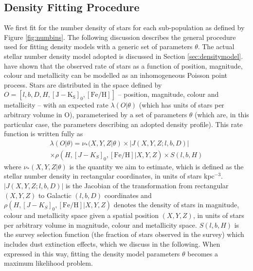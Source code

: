 \subsection{Density Fitting Procedure}
\label{sec:densfit}
We first fit for the number density of stars for each sub-population as defined by Figure \ref{fig:numbins}. The following discussion describes the general procedure used for fitting density models with a generic set of parameters $\theta$. The actual stellar number density model adopted is discussed in Section \ref{sec:densitymodel}. \citet{2016ApJ...823...30B,2012ApJ...753..148B,2013A&ARv..21...61R} have shown that the observed rate of stars as a function of position, magnitude, colour and metallicity can be modelled as an inhomogeneous Poisson point process. Stars are distributed in the space defined by $O = [l,b,D,H,\mathrm{[J-K_S]_0}, \mathrm{[Fe/H]}]$ -- position, magnitude, colour and metallicity -- with an expected rate $\lambda(O|\theta)$ (which has units of stars per arbitrary volume in O), parameterised by a set of parameters $\theta$ (which are, in this particular case, the parameters describing an adopted density profile). This rate function is written fully as
\begin{multline}
\lambda(O|\theta) = \nu_*(X,Y,Z|\theta) \times |J(X,Y,Z;l,b,D)| \\ \times \rho(H, [J-K_S]_0, \mathrm{[Fe/H]}|X,Y,Z) \times S(l,b,H) 
\label{eq:rate}
\end{multline}
where $\nu_*(X,Y,Z|\theta)$ is the quantity we aim to estimate, which is defined as the stellar number density in rectangular coordinates, in units of stars kpc$^{-3}$. $ |J(X,Y,Z;l,b,D)|$ is the Jacobian of the transformation from rectangular $(X,Y,Z)$ to Galactic $(l,b,D)$ coordinates and $ \rho(H, [J-K_S]_0, \mathrm{[Fe/H]}|X,Y,Z) $ denotes the density of stars in magnitude, colour and metallicity space given a spatial position $(X,Y,Z)$, in units of stars per arbitrary volume in magnitude, colour and metallicity space. $S(l,b,H)$ is the survey selection function (the fraction of stars observed in the survey) which includes dust extinction effects, which we discuss in the following. When expressed in this way, fitting the density model parameters $\theta$ becomes a maximum likelihood problem.

